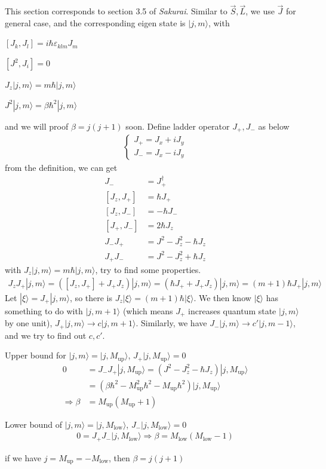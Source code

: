 \documentclass[UTF8,12pt]{article} %
\begin{document}
This section corresponds to section 3.5 of \textit{Sakurai}. Similar to $\vec{S}, \vec{L}$, we use $\vec{J}$ for general case, and the corresponding eigen state is $|j,m\rangle$, with
\begin{enumerate*}
\item $[J_{k}, J_{l}] = i\hbar\varepsilon_{klm}J_{m}$
\item $[J^{2}, J_{i}] = 0$
\item $J_{z}|j,m\rangle = m\hbar|j,m\rangle$
\item $J^{2}|j,m\rangle = \beta\hbar^{2}|j,m\rangle$
\end{enumerate*}
and we will proof $\beta = j(j + 1)$ soon. Define ladder operator $J_{+}, J_{-}$ as below
\begin{align}
\begin{cases}
J_{+} = J_{x} + iJ_{y} \\
J_{-} = J_{x} - iJ_{y}
\end{cases}
\end{align}
from the definition, we can get
\begin{align}
J_{-} &= J_{+}^{\dag} \\
[J_{z}, J_{+}] &= \hbar J_{+} \\
[J_{z}, J_{-}] &= -\hbar J_{-} \\
[J_{+}, J_{-}] &= 2\hbar J_{z} \\
J_{-}J_{+} &= J^{2} - J_{z}^{2} - \hbar J_{z} \\
J_{+}J_{-} &= J^{2} - J_{z}^{2} + \hbar J_{z}
\end{align}
with $J_{z}|j,m\rangle = m\hbar|j,m\rangle$, try to find some properties.
\begin{align}
J_{z}J_{+}|j,m\rangle = \left([J_{z}, J_{+}] + J_{+}J_{z}\right)|j,m\rangle = (\hbar J_{+} + J_{+}J_{z})|j,m\rangle = (m+1)\hbar J_{+}|j,m\rangle
\end{align}
Let $|\xi\rangle = J_{+}|j,m\rangle$, so there is $J_{z}|\xi\rangle = (m+1)\hbar|\xi\rangle$. We then know $|\xi\rangle$ has something to do with $|j,m+1\rangle$ (which means $J_{+}$ increases quantum state $|j,m\rangle$ by one unit), $J_{+}|j,m\rangle \rightarrow c|j,m+1\rangle$. Similarly, we have $J_{-}|j,m\rangle \rightarrow c'|j,m-1\rangle$, and we try to find out $c, c'$.
\begin{enumerate*}
\item Upper bound for $|j,m\rangle = |j,M_{\text{up}}\rangle$, $J_{+}|j,M_{\text{up}}\rangle = 0$
\begin{align}
0 &= J_{-}J_{+}|j,M_{\text{up}}\rangle = \left(J^{2} - J_{z}^{2} - \hbar J_{z}\right)|j,M_{\text{up}}\rangle \\
&= \left(\beta\hbar^{2} - M_{\text{up}}^{2}\hbar^{2} - M_{\text{up}}\hbar^{2}\right)|j,M_{\text{up}}\rangle \\
\Rightarrow \beta &= M_{\text{up}}(M_{\text{up}} + 1)
\end{align}
\item Lower bound of $|j,m\rangle = |j,M_{\text{low}}\rangle$, $J_{-}|j,M_{\text{low}}\rangle = 0$
\begin{align}
0 = J_{+}J_{-}|j,M_{\text{low}}\rangle \Rightarrow \beta = M_{\text{low}}(M_{\text{low}} - 1) 
\end{align}
\end{enumerate*}
if we have $j = M_{\text{up}} = -M_{\text{low}}$, then $\beta = j(j+1)$
\end{document}
